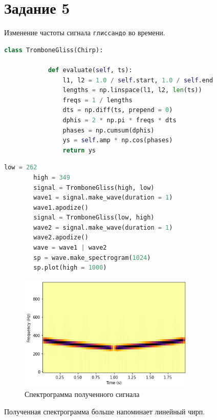 \documentclass[a4paper, 12pt]{report}
\begin{document}
	\section{Задание 5}
	Изменение частоты сигнала \texttt{глиссандо} во времени.
	\begin{lstlisting}[language=Python,caption=Новый класс для изменения частоты сигнала]
		class TromboneGliss(Chirp):
    
			def evaluate(self, ts):
				l1, l2 = 1.0 / self.start, 1.0 / self.end
				lengths = np.linspace(l1, l2, len(ts))
				freqs = 1 / lengths
				dts = np.diff(ts, prepend = 0)
				dphis = 2 * np.pi * freqs * dts
				phases = np.cumsum(dphis)
				ys = self.amp * np.cos(phases)
				return ys
	\end{lstlisting}
	\begin{lstlisting}[language=Python,caption=Получение требуемого сигнала]
		low = 262
		high = 349
		signal = TromboneGliss(high, low)
		wave1 = signal.make_wave(duration = 1)
		wave1.apodize()
		signal = TromboneGliss(low, high)
		wave2 = signal.make_wave(duration = 1)
		wave2.apodize()
		wave = wave1 | wave2
		sp = wave.make_spectrogram(1024)
		sp.plot(high = 1000)
	\end{lstlisting}
	\begin{figure}[H]
		\centering
		\includegraphics[width=0.75\textwidth]{test1.png}
		\caption{Спектрограмма полученного сигнала}
		\label{fig:test1}
	\end{figure}
	Полученная спектрограмма больше напоминает линейный чирп.	
\end{document}
